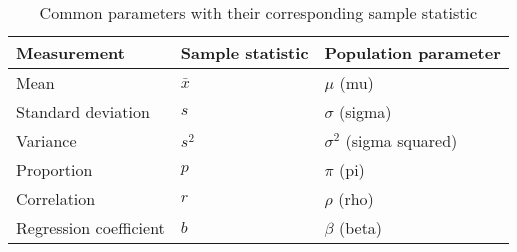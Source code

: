 \begin{table}[h]
    \centering
    \begin{tabular}{@{}lll@{}}
    \toprule
    \textbf{Measurement}   & \textbf{Sample statistic} & \textbf{Population parameter} \\
    \midrule
    Mean                   & $\bar{x}$                 & $\mu$ (mu)                    \\
    Standard deviation     & $s$                       & $\sigma$ (sigma)              \\
    Variance               & $s^2$                     & $\sigma^2$ (sigma squared)    \\
    Proportion             & $p$                       & $\pi$ (pi)                    \\
    Correlation            & $r$                       & $\rho$ (rho)                  \\
    Regression coefficient & $b$                       & $\beta$ (beta)              \\
    \bottomrule
    \end{tabular}
    \caption{Common parameters with their corresponding sample statistic}
    \label{tab:sample_stats}
\end{table}